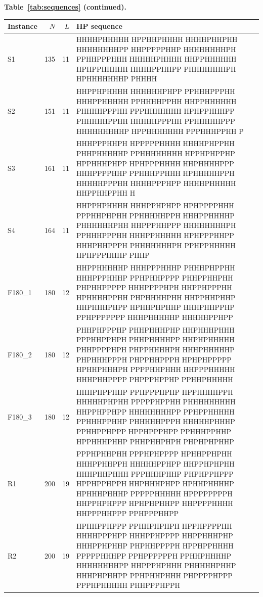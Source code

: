 \clearpage
\begin{center}
\textbf{Table~\ref{tab:sequences} (continued).}\par\medskip
\begin{tabular}{@{}lrr>{\raggedright\arraybackslash}p{}@{}}
\toprule Instance & $N$ & $L$ & HP sequence \\ \midrule
S1 & 135 & 11 & {\ttfamily\footnotesize HHHHPHHHHH HPPHHPHHHH HHHHPHHPHH HHHHHHHHPP HHPPPPPHHP HHHHHHHHPH PPHHPPPHHH HHHHHPHHHH HHPPHHHHHH HPHPPHHHHH HHHHPPHHPP PHHHHHHHPH HPHHHHHHHP PHHHH} \\[3pt]
S2 & 151 & 11 & {\ttfamily\footnotesize HHPPHPHHHH HHHHHHPHPP PPHHHPPPHH HHHPPHHHHH PPHHHHPPHH HHPPHHHHHH PHHHHPPPHH PPPHHHHHHH HPHPPHHHPP PHHHHHPPHH HHHHHPPPHH PPHHHHHPPP HHHHHHHHHP HPPHHHHHHH PPPHHHPPHH P} \\[3pt]
S3 & 161 & 11 & {\ttfamily\footnotesize HHHPPPHHPH HPPPPPHHHH HHHHPHPPHH PHHPHHHHHP PPHHHHHHHH HPPHPHPPHP HPPHHHPHPP HPHPPPHHHH HHPHHHHPPP HHHPPPPHHP PPHHHPPHHH HPHHHHHPPH HHHHHPPPHH HHHHPPPHPP HHHHPHHHHH HHPPHHPPHH H} \\[3pt]
S4 & 164 & 11 & {\ttfamily\footnotesize HHPPHPHHHH HHHPPHPHPP HPHPPPPHHH PPPHHPHPHH PPHHHHHPPH HHHPPHHHHP PHHHHHHPHH HHPPPHHPPP HHHHHHHHPH PPHHHPPPHH HHHPPHHHHH HPHPPPHHPP HHHPHHPPPH PHHHHHHHPH PPHPPHHHHH HPHPPPHHHP PHHP} \\[3pt]
F180\_1 & 180 & 12 & {\ttfamily\footnotesize HHPPHHHHHP HHHPPPHHHP PHHHPHPPHH HHHPPPHHHP PPHPHHPPPP PHHPPHHPHH PHPHHPPPPP HHHPPPPHPH HHPPHPPPHH HPHHHHPPHH PHPHHHHPHH HHPPHHPHHP HHPHHHPHPP HPHHPHPHHP HHHPHHPPHP PPHPPPPPPP HHHPHHHHHP HHHHHPPHPP} \\[3pt]
F180\_2 & 180 & 12 & {\ttfamily\footnotesize PHHPHPPPHP PHHPHHHPHP HHPHHHPHHH PPPHHPPHPH PHHPHHHHPP HHPHPHHHHH PHHPPPPHPH PHPPHHHHPH HHHPHHHHHP PHPHHHPPPH PHPPHHPPPH HPHPHPPPPP HPHHPHHHPH PPPPHHPHHH HHPPPHHHHH HHHPHHPPPP PHPPPHPPHP PPHHPHHHHH} \\[3pt]
F180\_3 & 180 & 12 & {\ttfamily\footnotesize HHHPHPPHHP PPHPPPHPHP HPPHHHHPPH HHHHHPHPHH PPPPPHPPHH PHHHHHHHHH HHPPHPPHPP HHHHHHHHPP PPHPPHHHHH PPHHHPPHHP PHHHHHPPPH HHHHHPHHHP PPHHPPHPPP HPPHPPPHPP PPHHHPPHHP HPPHHHPHHP PHHPHHPHPH PHPHPHPHHP} \\[3pt]
R1 & 200 & 19 & {\ttfamily\footnotesize PPPHPHHPHH PPPHPHPPPP HPHHPPHPHH HHHPPHHPPH HHHHHPPHPP HHPPHPHPHH HHHPHHPHHH PPPHHHPHHP PHPHPPHPPP HPPHPPHPPH HHPHHHPHPP HPHHPHHHHP HPHHHPHHHP PPPPPHHHHH HPPPPPPPPH HHPPHPHPPP HPHPHPHHPP HHPPPPHHHH HHPPPHHPPP PPHPPPHHPP} \\[3pt]
R2 & 200 & 19 & {\ttfamily\footnotesize HPHHPPHPPP PPHHPHPHPH HPPHPPPPHH HHHHPPPHPP HHHPPHPPPP HHPPHHHPHP HHHPPHPHHP PHPHHPPPPH HPPHPPHHHH PPPPPHHHPP PPHPPPPPPH PPHHPHHHHP HHHHHHHHPP HHPPPHPHHH PHHHHHPHHP HHHPHPHHPP PPHPHHPHHH PHPPPPHPPP PPPHPHHHHH PHHPPPHPPH} \\[3pt]

\end{tabular}
\end{center}
